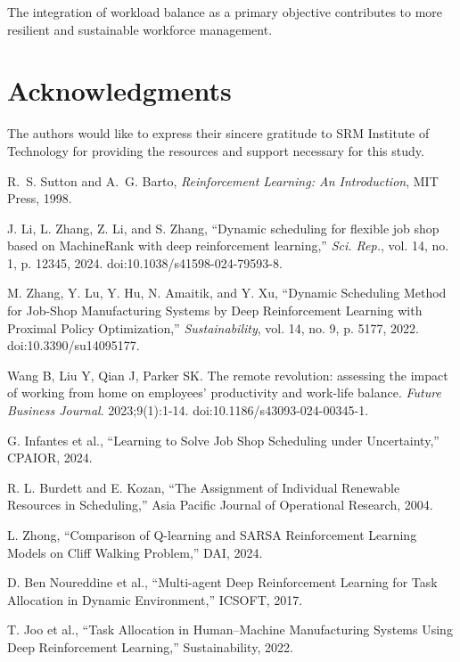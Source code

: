 \documentclass[12pt]{article}
\begin{document}
	The integration of workload balance as a primary objective contributes to more resilient and sustainable workforce management.
	
	\section*{Acknowledgments}
		The authors would like to express their sincere gratitude to SRM Institute of
	Technology for providing the resources and support necessary for this study.
		\nocite{*}
	
	\begin{thebibliography}{99}
		
		
		R.~S. Sutton and A.~G. Barto, \emph{Reinforcement Learning: An Introduction}, MIT Press, 1998.
		
		J. Li, L. Zhang, Z. Li, and S. Zhang, ``Dynamic scheduling for flexible job shop based on MachineRank with deep reinforcement learning,'' \textit{Sci. Rep.}, vol. 14, no. 1, p. 12345, 2024. doi:10.1038/s41598-024-79593-8.
		
		M. Zhang, Y. Lu, Y. Hu, N. Amaitik, and Y. Xu, ``Dynamic Scheduling Method for Job-Shop Manufacturing Systems by Deep Reinforcement Learning with Proximal Policy Optimization,'' \textit{Sustainability}, vol. 14, no. 9, p. 5177, 2022. doi:10.3390/su14095177.
		
		
		
		Wang B, Liu Y, Qian J, Parker SK. The remote revolution: assessing the impact of working from home on employees' productivity and work-life balance. \textit{Future Business Journal}. 2023;9(1):1-14. doi:10.1186/s43093-024-00345-1.
		
		 G. Infantes et al., ``Learning to Solve Job Shop Scheduling
		under Uncertainty,'' CPAIOR, 2024.
		
		 R. L. Burdett and E. Kozan, ``The Assignment of
		Individual Renewable Resources in Scheduling,'' Asia Pacific Journal of
		Operational Research, 2004.
		
		 L. Zhong, ``Comparison of Q-learning and SARSA
		Reinforcement Learning Models on Cliff Walking Problem,'' DAI, 2024.
		
		 D. Ben Noureddine et al., ``Multi-agent Deep Reinforcement
		Learning for Task Allocation in Dynamic Environment,'' ICSOFT, 2017.
		
		 T. Joo et al., ``Task Allocation in Human–Machine Manufacturing
		Systems Using Deep Reinforcement Learning,'' Sustainability, 2022.
		

\end{thebibliography}
\end{document}
